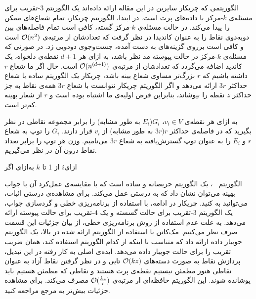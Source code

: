 
الگوریتمی که چریکار سایرین در این مقاله ارائه داده‌اند یک الگوریتم $3$-تقریب برای مسئله‌ی $k$-مرکز با داده‌های پرت است. در ابتدا، الگوریتم چریکار، تمام شعاع‌های ممکن را پیدا می‌کند. در حالت مسئله‌ی $k$-مرکز گسته، کافی است تمام فاصله‌های بین دوبه‌دوی نقاط را به عنوان کاندیدا در نظر گرفت که تعدادشان از مرتبه‌ی $\mathcal{O}(n^2)$ است و کافی است برروی گزینه‌های به دست آمده، جست‌وجوی دودویی زد. در صورتی که مسئله‌ی $k$-مرکز در حالت پیوسته مد نظر باشد، به ازای هر $d+1$ نقطه‌ی دلخواه، یک کاندید اضافه می‌گردد که تعدادشان از مرتبه‌ی $\mathcal{O}(n^{(d+1)})$ است. حال اگر ما شعاع $r$ داشته باشیم که $r$ بزرگ‌تر مساوی شعاع بینه باشد، چریکار یک الگوریتم ساده با شعاع حداکثر $3r$ ارائه می‌دهد و اگر الگوریتم چریکار نتوانست با شعاع $3r$ همه‌ی نقاط به جز حداکثر $z$ نقطه را بپوشاند، بنابراین فرض اولیه‌ی ما اشتباه بوده است و $r$ از شعار بهینه کم‌تر است.


به ازای هر نقطه‌ی $v_i \in V$، $G_i$($E_i$ به طور مشابه) را برابر مجموعه‌ نقاطی در نظر بگیرید که در فاصله‌ی حداکثر $r$($3r$ به طور مشابه) از $v_i$ قرار دارند. $G_i$ را توپ به شعاع $r$ و  $E_i$ را به عنوان توپ گسترش‌یافته به شعاع $3r$ می‌نامیم. وزن هر توپ را برابر تعداد نقاط درون آن در نظر می‌گیریم.


‌ازای{$i$ از 1 تا $k$}
‌به‌ازای
‌اگر

الگوریتم ~، یک الگوریتم حریصانه و ساده است که با مقایسه‌ی عمل‌کرد آن با جواب بهینه می‌توان نشان داد که به درستی عمل می‌کند. برای مشاهده‌ی درستی اثبات، می‌توانید به  کنید. چریکار در ادامه، با استفاده از برنامه‌ریزی خطی و گردسازی جواب، یک الگوریتم $3$-تقریب برای حالت گسسته و یک $4$-تقریب برای حالت پیوسته ارائه می‌دهد. به علت عدم استفاده از روش برنامه‌ریزی خطی، از بیان جزئیات این قسمت صرف نظر می‌کنیم. مک‌کاتن با استفاده از الگوریتم ارائه شده در بالا، یک الگوریتم جویبار داده ارائه داد که متناسب با اینکه از کدام الگوریتم استفاده کند، همان ضریب تقریب را  برای حالت جویبار داده می‌دهد. ایده‌ی اصلی به‌ کار رفته در این تبدیل، پردازش نقاط به صورت دسته‌های $\mathcal{O}(kz)$ تایی و در نظر گرفتن نقاط آزاد به عنوان نقاطی هنوز مطمئن نیستیم نقطه‌ی پرت هستند و نقاطی که مطمئن هستیم باید پوشانده شوند. این الگوریتم حافظه‌ای ار مرتبه‌ی $\mathcal{O}(\frac{kz}{\epsilon})$ مصرف می‌کند. برای مشاهده جزئیات بیش‌تر به مرجع  مراجعه کنید.

